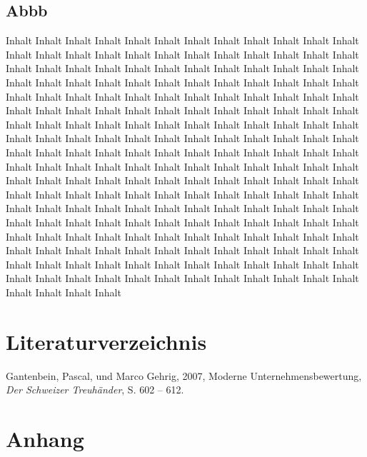 \documentclass[11pt,a4paper,titlepage]{scrartcl}
\begin{document}
\subsection{Abbb}
Inhalt Inhalt Inhalt Inhalt Inhalt Inhalt Inhalt Inhalt Inhalt Inhalt Inhalt Inhalt Inhalt Inhalt Inhalt Inhalt Inhalt Inhalt Inhalt Inhalt Inhalt Inhalt Inhalt Inhalt Inhalt Inhalt Inhalt Inhalt Inhalt Inhalt Inhalt Inhalt Inhalt Inhalt Inhalt Inhalt Inhalt Inhalt Inhalt Inhalt Inhalt Inhalt Inhalt Inhalt Inhalt Inhalt Inhalt Inhalt Inhalt Inhalt Inhalt Inhalt Inhalt Inhalt Inhalt Inhalt Inhalt Inhalt Inhalt Inhalt Inhalt Inhalt Inhalt Inhalt Inhalt Inhalt Inhalt Inhalt Inhalt Inhalt Inhalt Inhalt Inhalt Inhalt Inhalt Inhalt Inhalt Inhalt Inhalt Inhalt Inhalt Inhalt Inhalt Inhalt Inhalt Inhalt Inhalt Inhalt Inhalt Inhalt Inhalt Inhalt Inhalt Inhalt Inhalt Inhalt Inhalt Inhalt Inhalt Inhalt Inhalt Inhalt Inhalt Inhalt Inhalt Inhalt Inhalt Inhalt Inhalt Inhalt Inhalt Inhalt Inhalt Inhalt Inhalt Inhalt Inhalt Inhalt Inhalt Inhalt Inhalt Inhalt Inhalt Inhalt Inhalt Inhalt Inhalt Inhalt Inhalt Inhalt Inhalt Inhalt Inhalt Inhalt Inhalt Inhalt Inhalt Inhalt Inhalt Inhalt Inhalt Inhalt Inhalt Inhalt Inhalt Inhalt Inhalt Inhalt Inhalt Inhalt Inhalt Inhalt Inhalt Inhalt Inhalt Inhalt Inhalt Inhalt Inhalt Inhalt Inhalt Inhalt Inhalt Inhalt Inhalt Inhalt Inhalt Inhalt Inhalt Inhalt Inhalt Inhalt Inhalt Inhalt Inhalt Inhalt Inhalt Inhalt Inhalt Inhalt Inhalt Inhalt Inhalt Inhalt Inhalt Inhalt Inhalt Inhalt Inhalt Inhalt Inhalt Inhalt Inhalt Inhalt Inhalt Inhalt Inhalt Inhalt Inhalt Inhalt Inhalt Inhalt Inhalt Inhalt Inhalt Inhalt Inhalt Inhalt Inhalt Inhalt Inhalt Inhalt Inhalt Inhalt Inhalt Inhalt Inhalt Inhalt Inhalt Inhalt  



\newpage
\section{Literaturverzeichnis}
Gantenbein, Pascal, und Marco Gehrig, 2007, Moderne Unternehmensbewertung, \textit{Der
Schweizer Treuhänder}, S. 602 – 612.


\newpage
\section{Anhang}
\end{document}
